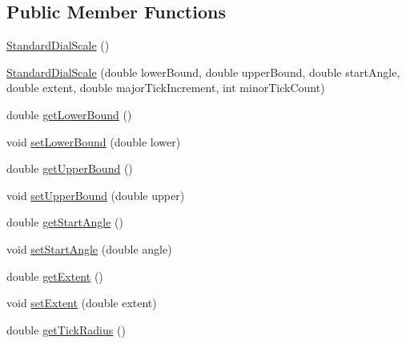 \subsection*{Public Member Functions}
\begin{DoxyCompactItemize}
\item 
\mbox{\hyperlink{classorg_1_1jfree_1_1chart_1_1plot_1_1dial_1_1_standard_dial_scale_af5acb0e07a1f637e14fd2c784391d0f4}{Standard\+Dial\+Scale}} ()
\item 
\mbox{\hyperlink{classorg_1_1jfree_1_1chart_1_1plot_1_1dial_1_1_standard_dial_scale_a004024e7f445ba5129fd6ec3d28ef2e0}{Standard\+Dial\+Scale}} (double lower\+Bound, double upper\+Bound, double start\+Angle, double extent, double major\+Tick\+Increment, int minor\+Tick\+Count)
\item 
double \mbox{\hyperlink{classorg_1_1jfree_1_1chart_1_1plot_1_1dial_1_1_standard_dial_scale_a25daa271788869d663df48885997624e}{get\+Lower\+Bound}} ()
\item 
void \mbox{\hyperlink{classorg_1_1jfree_1_1chart_1_1plot_1_1dial_1_1_standard_dial_scale_a3462e39fd0c8f86aeb01747fbfeb7b7a}{set\+Lower\+Bound}} (double lower)
\item 
double \mbox{\hyperlink{classorg_1_1jfree_1_1chart_1_1plot_1_1dial_1_1_standard_dial_scale_aac8a93d9053c13224408742acfd00e08}{get\+Upper\+Bound}} ()
\item 
void \mbox{\hyperlink{classorg_1_1jfree_1_1chart_1_1plot_1_1dial_1_1_standard_dial_scale_ae26419137b686bc872cc0c78f8c17c3d}{set\+Upper\+Bound}} (double upper)
\item 
double \mbox{\hyperlink{classorg_1_1jfree_1_1chart_1_1plot_1_1dial_1_1_standard_dial_scale_a89929cd8cb1353ecd67b765bd81a75f7}{get\+Start\+Angle}} ()
\item 
void \mbox{\hyperlink{classorg_1_1jfree_1_1chart_1_1plot_1_1dial_1_1_standard_dial_scale_a7ecdab2cc09f48852e955c53e66d1671}{set\+Start\+Angle}} (double angle)
\item 
double \mbox{\hyperlink{classorg_1_1jfree_1_1chart_1_1plot_1_1dial_1_1_standard_dial_scale_a7be4f1dfca3997ea1ed3ff965ebdc820}{get\+Extent}} ()
\item 
void \mbox{\hyperlink{classorg_1_1jfree_1_1chart_1_1plot_1_1dial_1_1_standard_dial_scale_aae4c0d37a11986b91a2a4eff563137a8}{set\+Extent}} (double extent)
\item 
double \mbox{\hyperlink{classorg_1_1jfree_1_1chart_1_1plot_1_1dial_1_1_standard_dial_scale_a6180a42bb175a95a1636ae3d050f3983}{get\+Tick\+Radius}} ()
\item 

\end{DoxyCompactItemize}

